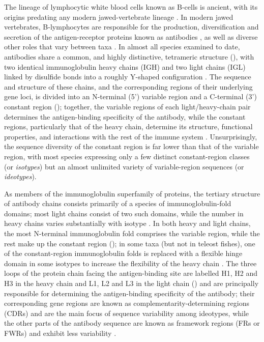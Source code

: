 The lineage of lymphocytic white blood cells known as B-cells is ancient, with its origins predating any modern jawed-vertebrate lineage \parencite{boehm2011design,kasahara2015vlr}. In modern jawed vertebrates, B-lymphocytes are responsible for the production, diversification and secretion of the antigen-receptor proteins known as antibodies \parencite{mix2006immunoglobulins,schroeder2010immunoglobulins}, as well as diverse other roles that vary between taxa \parencite{sunyer2013fishing}. In almost all species examined to date, antibodies share a common, and highly distinctive, tetrameric structure (), with two identical immunoglobulin heavy chains (IGH) and two light chains (IGL) linked by disulfide bonds into a roughly Y-shaped configuration \parencite{mix2006immunoglobulins,schroeder2010immunoglobulins}. The sequence and structure of these chains, and the corresponding regions of their underlying gene loci, is divided into an N-terminal (5') variable region and a C-terminal (3') constant region \parencite{mix2006immunoglobulins} (); together, the variable regions of each light/heavy-chain pair determines the antigen-binding specificity of the antibody, while the constant regions, particularly that of the heavy chain, determine its structure, functional properties, and interactions with the rest of the immune system \parencite{mix2006immunoglobulins,schroeder2010immunoglobulins}. Unsurprisingly, the sequence diversity of the constant region is far lower than that of the variable region, with most species expressing only a few distinct constant-region classes (or \textit{isotypes}) but an almost unlimited variety of variable-region sequences (or \textit{ideotypes}).

As members of the immunoglobulin superfamily of proteins, the tertiary structure of antibody chains consists primarily of a species of immunoglobulin-fold domains; most light chains consist of two such domains, while the number in heavy chains varies substantially with isotype \parencite{schroeder2010immunoglobulins}. In both heavy and light chains, the most N-terminal immunoglobulin fold comprises the variable region, while the rest make up the constant region (); in some taxa (but not in teleost fishes), one of the constant-region immunoglobulin folds is replaced with a flexible hinge domain in some isotypes to increase the flexibility of the heavy chain \parencite{schroeder2010immunoglobulins}. The three loops of the protein chain facing the antigen-binding site are labelled H1, H2 and H3 in the heavy chain and L1, L2 and L3 in the light chain () \parencite{shirai1999h3} and are principally responsible for determining the antigen-binding specificity of the antibody; their corresponding gene regions are known as complementarity-determining regions (CDRs) and are the main focus of sequence variability among ideotypes, while the other parts of the antibody sequence are known as framework regions (FRs or FWRs) and exhibit less variability \parencite{schroeder2010immunoglobulins}.

